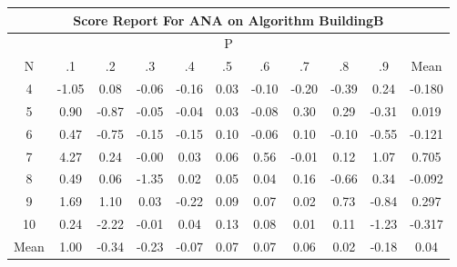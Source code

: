\documentclass[11pt,a4paper]{report}
\begin{document}
\begin{longtable}{ | c || c | c | c | c | c | c | c | c | c || c |}
\hline
\multicolumn{11}{|c|}{ Score Report For ANA on Algorithm BuildingB} \\
\hline
\multicolumn{11}{|c|}{ P } \\
\hline
N & .1 & .2 & .3 & .4 & .5 & .6 & .7 & .8 & .9 & Mean\\
 \hline
 \hline
 \endhead
  4 &  \cellcolor[HTML]{FFE7E7} -1.05 &  \cellcolor[HTML]{FFFFFF} 0.08 &  \cellcolor[HTML]{FFFFFF} -0.06 &  \cellcolor[HTML]{FFF7F7} -0.16 &  \cellcolor[HTML]{FFFFFF} 0.03 &  \cellcolor[HTML]{FFFFFF} -0.10 &  \cellcolor[HTML]{FFF7F7} -0.20 &  \cellcolor[HTML]{FFF7F7} -0.39 &  \cellcolor[HTML]{F7F7FF} 0.24 & -0.180 \\
  5 &  \cellcolor[HTML]{E7E7FF} 0.90 &  \cellcolor[HTML]{FFE7E7} -0.87 &  \cellcolor[HTML]{FFFFFF} -0.05 &  \cellcolor[HTML]{FFFFFF} -0.04 &  \cellcolor[HTML]{FFFFFF} 0.03 &  \cellcolor[HTML]{FFFFFF} -0.08 &  \cellcolor[HTML]{F7F7FF} 0.30 &  \cellcolor[HTML]{F7F7FF} 0.29 &  \cellcolor[HTML]{FFF7F7} -0.31 & 0.019 \\
  6 &  \cellcolor[HTML]{F7F7FF} 0.47 &  \cellcolor[HTML]{FFEFEF} -0.75 &  \cellcolor[HTML]{FFFFFF} -0.15 &  \cellcolor[HTML]{FFFFFF} -0.15 &  \cellcolor[HTML]{FFFFFF} 0.10 &  \cellcolor[HTML]{FFFFFF} -0.06 &  \cellcolor[HTML]{FFFFFF} 0.10 &  \cellcolor[HTML]{FFFFFF} -0.10 &  \cellcolor[HTML]{FFEFEF} -0.55 & -0.121 \\
  7 &  \cellcolor[HTML]{9797FF} 4.27 &  \cellcolor[HTML]{F7F7FF} 0.24 &  \cellcolor[HTML]{FFFFFF} -0.00 &  \cellcolor[HTML]{FFFFFF} 0.03 &  \cellcolor[HTML]{FFFFFF} 0.06 &  \cellcolor[HTML]{EFEFFF} 0.56 &  \cellcolor[HTML]{FFFFFF} -0.01 &  \cellcolor[HTML]{FFFFFF} 0.12 &  \cellcolor[HTML]{E7E7FF} 1.07 & 0.705 \\
  8 &  \cellcolor[HTML]{EFEFFF} 0.49 &  \cellcolor[HTML]{FFFFFF} 0.06 &  \cellcolor[HTML]{FFDFDF} -1.35 &  \cellcolor[HTML]{FFFFFF} 0.02 &  \cellcolor[HTML]{FFFFFF} 0.05 &  \cellcolor[HTML]{FFFFFF} 0.04 &  \cellcolor[HTML]{F7F7FF} 0.16 &  \cellcolor[HTML]{FFEFEF} -0.66 &  \cellcolor[HTML]{F7F7FF} 0.34 & -0.092 \\
  9 &  \cellcolor[HTML]{D7D7FF} 1.69 &  \cellcolor[HTML]{E7E7FF} 1.10 &  \cellcolor[HTML]{FFFFFF} 0.03 &  \cellcolor[HTML]{FFF7F7} -0.22 &  \cellcolor[HTML]{FFFFFF} 0.09 &  \cellcolor[HTML]{FFFFFF} 0.07 &  \cellcolor[HTML]{FFFFFF} 0.02 &  \cellcolor[HTML]{EFEFFF} 0.73 &  \cellcolor[HTML]{FFE7E7} -0.84 & 0.297 \\
  10 &  \cellcolor[HTML]{F7F7FF} 0.24 &  \cellcolor[HTML]{FFC7C7} -2.22 &  \cellcolor[HTML]{FFFFFF} -0.01 &  \cellcolor[HTML]{FFFFFF} 0.04 &  \cellcolor[HTML]{FFFFFF} 0.13 &  \cellcolor[HTML]{FFFFFF} 0.08 &  \cellcolor[HTML]{FFFFFF} 0.01 &  \cellcolor[HTML]{FFFFFF} 0.11 &  \cellcolor[HTML]{FFDFDF} -1.23 & -0.317 \\
 \hline
 \hline
Mean &  \cellcolor[HTML]{E7E7FF} 1.00 &  \cellcolor[HTML]{FFF7F7} -0.34 &  \cellcolor[HTML]{FFF7F7} -0.23 &  \cellcolor[HTML]{FFFFFF} -0.07 &  \cellcolor[HTML]{FFFFFF} 0.07 &  \cellcolor[HTML]{FFFFFF} 0.07 &  \cellcolor[HTML]{FFFFFF} 0.06 &  \cellcolor[HTML]{FFFFFF} 0.02 &  \cellcolor[HTML]{FFF7F7} -0.18 &  \cellcolor[HTML]{FFFFFF} 0.04
\end{longtable}
\end{document}
